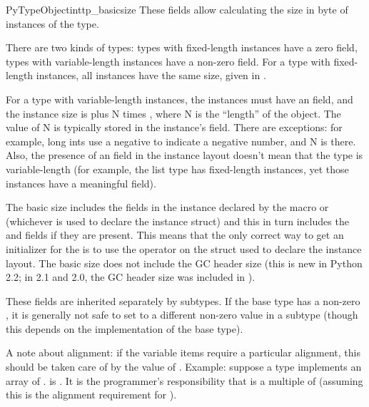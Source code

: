 \begin{cmemberdesc}{PyTypeObject}{int}{tp_basicsize}
  These fields allow calculating the size in byte of instances of
  the type.

  There are two kinds of types: types with fixed-length instances have
  a zero  field, types with variable-length
  instances have a non-zero  field.  For a type
  with fixed-length instances, all instances have the same size,
  given in .

  For a type with variable-length instances, the instances must have
  an  field, and the instance size is
   plus N times , where N is
  the ``length'' of the object.  The value of N is typically stored in
  the instance's  field.  There are exceptions:  for
  example, long ints use a negative  to indicate a
  negative number, and N is  there.  Also,
  the presence of an  field in the instance layout
  doesn't mean that the type is variable-length (for example, the list
  type has fixed-length instances, yet those instances have a
  meaningful  field).

  The basic size includes the fields in the instance declared by the
  macro  or
   (whichever is used to declare the
  instance struct) and this in turn includes the  and
   fields if they are present.  This means that the
  only correct way to get an initializer for the 
  is to use the  operator on the struct used to
  declare the instance layout.  The basic size does not include the GC
  header size (this is new in Python 2.2; in 2.1 and 2.0, the GC
  header size was included in ).

  These fields are inherited separately by subtypes.  If the base type
  has a non-zero , it is generally not safe to set
   to a different non-zero value in a subtype
  (though this depends on the implementation of the base type).

  A note about alignment: if the variable items require a particular
  alignment, this should be taken care of by the value of
  .  Example: suppose a type implements an array
  of .  is .
  It is the programmer's responsibility that  is
  a multiple of  (assuming this is the alignment
  requirement for ).
\end{cmemberdesc}

